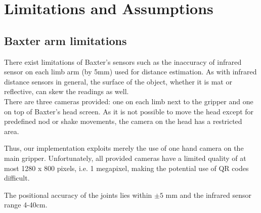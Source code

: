\section{Limitations and Assumptions}\label{Limitations}
\subsection{Baxter arm limitations}
There exist limitations of Baxter's sensors such as the inaccuracy of infrared sensor on each limb arm (by 5mm) used for distance estimation. As with infrared distance sensors in general, the surface of the object, whether it is mat or reflective, can skew the readings as well.\\

There are three cameras provided: one on each limb next to the gripper and one on top of Baxter's head screen. As it is not possible to move the head except for predefined nod or shake movements, the camera on the head has a restricted area. 

Thus, our implementation exploits merely the use of one hand camera on the main gripper. Unfortunately, all provided cameras have a limited quality of at most 1280 x 800 pixels, i.e. 1 megapixel, making the potential use of QR codes difficult.

The positional accuracy of the joints lies within $\pm 5$ mm and the infrared sensor range 4-40cm. \cite{robotics2013baxter}


